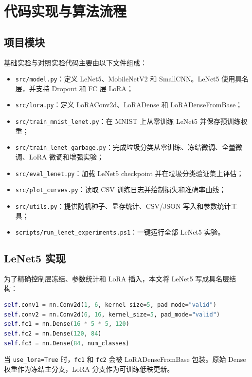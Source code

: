 \chapter{代码实现与算法流程}\label{chap:design}

\section{项目模块}

基础实验与对照实验代码主要由以下文件组成：

\begin{itemize}
  \item \texttt{src/model.py}：定义 LeNet5、MobileNetV2 和 SmallCNN。LeNet5 使用具名层，并支持 Dropout 和 FC 层 LoRA；
  \item \texttt{src/lora.py}：定义 LoRAConv2d、LoRADense 和 LoRADenseFromBase；
  \item \texttt{src/train\_mnist\_lenet.py}：在 MNIST 上从零训练 LeNet5 并保存预训练权重；
  \item \texttt{src/train\_lenet\_garbage.py}：完成垃圾分类从零训练、冻结微调、全量微调、LoRA 微调和增强实验；
  \item \texttt{src/eval\_lenet.py}：加载 LeNet5 checkpoint 并在垃圾分类验证集上评估；
  \item \texttt{src/plot\_curves.py}：读取 CSV 训练日志并绘制损失和准确率曲线；
  \item \texttt{src/utils.py}：提供随机种子、显存统计、CSV/JSON 写入和参数统计工具；
  \item \texttt{scripts/run\_lenet\_experiments.ps1}：一键运行全部 LeNet5 实验。
\end{itemize}

\section{LeNet5 实现}

为了精确控制层冻结、参数统计和 LoRA 插入，本文将 LeNet5 写成具名层结构：

\begin{lstlisting}[language=Python,numbers=none]
self.conv1 = nn.Conv2d(1, 6, kernel_size=5, pad_mode="valid")
self.conv2 = nn.Conv2d(6, 16, kernel_size=5, pad_mode="valid")
self.fc1 = nn.Dense(16 * 5 * 5, 120)
self.fc2 = nn.Dense(120, 84)
self.fc3 = nn.Dense(84, num_classes)
\end{lstlisting}

当 \texttt{use\_lora=True} 时，\texttt{fc1} 和 \texttt{fc2} 会被 LoRADenseFromBase 包装。原始 Dense 权重作为冻结主分支，LoRA 分支作为可训练低秩更新。

